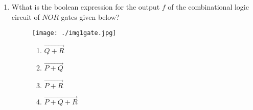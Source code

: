 \documentclass{article}
\begin{document}
\begin{enumerate}
\item Wthat is the boolean expression for the output $f$ of the combinational logic circuit of $NOR$ gates given below$?$
\begin{figure}[H]
	\texttt{[image: ./img1gate.jpg]}
	\label{fig:fig1}
	\caption{}
	\begin{enumerate}
		\item$\vec{Q+R}$
		\item$\vec{P+Q}$
		\item$\vec{P+R}$
		\item$\vec{P+Q+R}$
	\end{enumerate}
\end{figure}
\end{enumerate}
\end{document}
